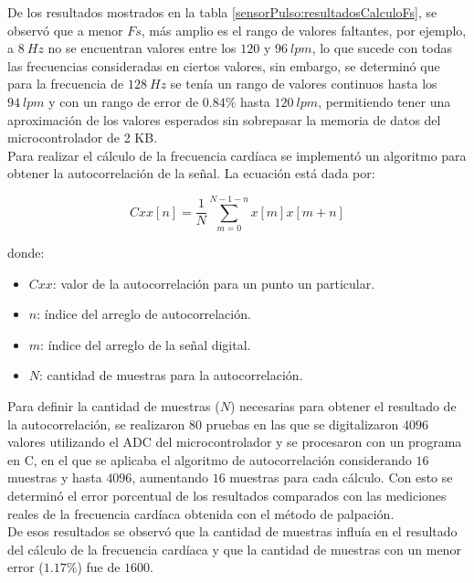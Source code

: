 De los resultados mostrados en la tabla  \ref{sensorPulso:resultadosCalculoFs}, se observó que a menor $Fs$, más amplio es el rango de valores faltantes, por ejemplo, a $8\ Hz$ no se encuentran valores entre los $120$ y $96\ lpm$, lo que sucede con todas las frecuencias consideradas en ciertos valores, sin embargo, se determinó que para la frecuencia de $128\ Hz$ se tenía un rango de valores continuos hasta los $94\ lpm$ y con un rango de error de $0.84\%$ hasta $120\ lpm$, permitiendo tener una aproximación de los valores esperados sin sobrepasar la memoria de datos del microcontrolador de 2 KB. \\

Para realizar el cálculo de la frecuencia cardíaca se implementó un algoritmo para obtener la autocorrelación de la señal. La ecuación está dada por:

\begin{equation}
\label{eq:autocorr}
Cxx[n] = \frac{1}{N} \sum_{m=0}^{N-1-n}x[m]x[m+n]
\end{equation}

donde: 
\begin{itemize}
	\item $Cxx$: valor de la autocorrelación para un punto un particular.
	\item $n$: índice del arreglo de autocorrelación.
	\item $m$: índice del arreglo de la señal digital.
	\item $N$: cantidad de muestras para la autocorrelación.\\
\end{itemize}

Para definir la cantidad de muestras ($N$) necesarias para obtener el resultado de la autocorrelación, se realizaron 80 pruebas en las que se digitalizaron $4096$ valores utilizando el ADC del microcontrolador y se procesaron con un programa en C, en el que se aplicaba el algoritmo de autocorrelación considerando $16$ muestras y hasta $4096$, aumentando $16$ muestras para cada cálculo. Con esto se determinó el error porcentual de los resultados comparados con las mediciones reales de la frecuencia cardíaca obtenida con el método de palpación. \\

De esos resultados se observó que la cantidad de muestras influía en el resultado del cálculo de la frecuencia cardíaca y que la cantidad de muestras con un menor error ($1.17\%$) fue de $1600$. \\

